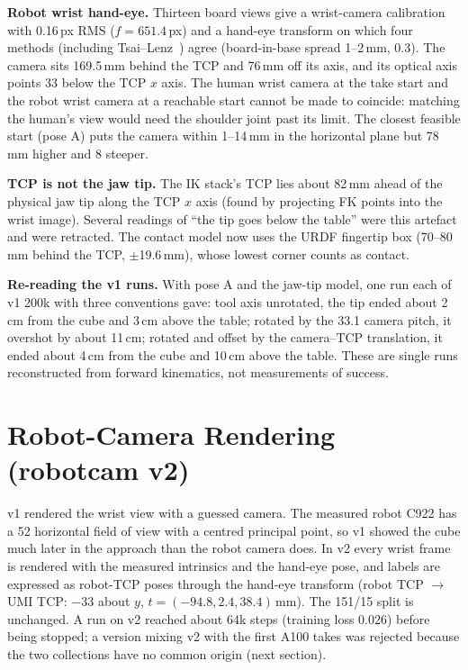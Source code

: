 \documentclass[conference,10pt]{IEEEtran}
\newcommand{\mm}{\,mm\xspace}
\begin{document}
\textbf{Robot wrist hand-eye.} Thirteen board views give a wrist-camera calibration with 0.16\,px RMS ($f=651.4$\,px) and a
hand-eye transform on which four methods (including Tsai--Lenz~\cite{tsai1989handeye}) agree (board-in-base spread 1--2\mm, 0.3\textdegree). The camera sits 169.5\mm
behind the TCP and 76\mm off its axis, and its optical axis points 33\textdegree{} below the TCP $x$ axis. The human wrist
camera at the take start and the robot wrist camera at a reachable start cannot be made to coincide: matching the human's
view would need the shoulder joint past its limit. The closest feasible start (pose A) puts the camera within 1--14\mm in the
horizontal plane but 78\mm higher and 8\textdegree{} steeper.

\textbf{TCP is not the jaw tip.} The IK stack's TCP lies about 82\mm ahead of the physical jaw tip along the TCP $x$ axis
(found by projecting FK points into the wrist image). Several readings of ``the tip goes below the table'' were this artefact
and were retracted. The contact model now uses the URDF fingertip box (70--80\mm behind the TCP, $\pm$19.6\mm), whose lowest
corner counts as contact.

\textbf{Re-reading the v1 runs.} With pose A and the jaw-tip model, one run each of v1 200k with three conventions gave: tool
axis unrotated, the tip ended about 2\,cm from the cube and 3\,cm above the table; rotated by the 33.1\textdegree{} camera
pitch, it overshot by about 11\,cm; rotated and offset by the camera--TCP translation, it ended about 4\,cm from the cube and
10\,cm above the table. These are single runs reconstructed from forward kinematics, not measurements of success.

\section{Robot-Camera Rendering (robotcam v2)}\label{p2:sec:v2}
v1 rendered the wrist view with a guessed camera. The measured robot C922 has a 52\textdegree{} horizontal field of view with
a centred principal point, so v1 showed the cube much later in the approach than the robot camera does. In v2 every wrist
frame is rendered with the measured intrinsics and the hand-eye pose, and labels are expressed as robot-TCP poses through the
hand-eye transform (robot TCP $\to$ UMI TCP: $-33$\textdegree{} about $y$, $t=(-94.8, 2.4, 38.4)$\mm). The 151/15 split is
unchanged. A run on v2 reached about 64k steps (training loss 0.026) before being stopped; a version mixing v2 with the first
A100 takes was rejected because the two collections have no common origin (next section).
\end{document}

